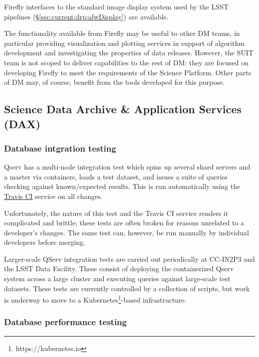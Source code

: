 \documentclass[DM,authoryear,toc,lsstdraft]{lsstdoc}
\begin{document}
Firefly interfaces to the standard image display system used by the LSST
pipelines (\S\ref{sec:current:drp:afwDisplay}) are available.

The functionality available from Firefly may be useful to other DM teams, in
particular providing visualization and plotting services in support of
algorithm development and investigating the properties of data releases.
However, the SUIT team is not scoped to deliver capabilities to the rest of
DM: they are focused on developing Firefly to meet the requirements of the
Science Platform. Other parts of DM may, of course, benefit from the tools
developed for this purpose.

\subsection{Science Data Archive \& Application Services (DAX)}
\label{sec:current:dax}

\subsubsection{Database intgration testing}
\label{sec:current:dax:dbint}

Qserv has a multi-node integration test which spins up several shard servers
and a master via containers, loads a test dataset, and issues a suite of
queries checking against known/expected results. This is run automatically
using the \href{https://travis-ci.org}{Travis CI} service on all changes.

Unfortunately, the nature of this test and the Travis CI service renders it
complicated and brittle; these tests are often broken for reasons unrelated to
a developer's changes. The same test can, however, be run manually by
individual developers before merging.

Larger-scale QServ integration tests are carried out periodically at CC-IN2P3
and the LSST Data Facility. These consist of deploying the containerized Qserv
system across a large cluster and executing queries against large-scale test
datasets. These tests are currently controlled by a collection of scripts, but
work is underway to move to a Kubernetes\footnote{https://kubernetes.io}-based
infrastructure.

\subsubsection{Database performance testing}
\label{sec:current:dax:dbperf}
\end{document}
